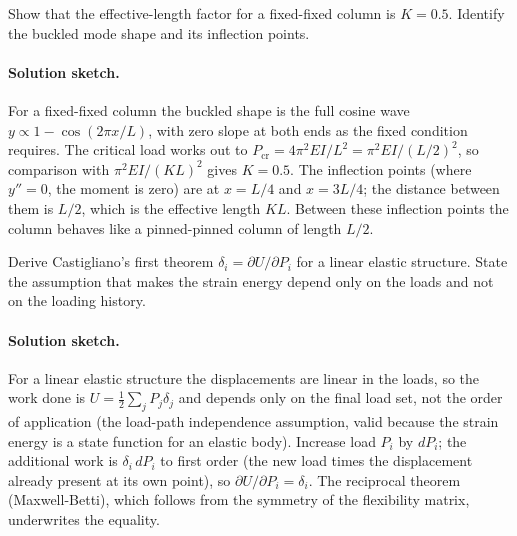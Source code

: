 \begin{exercise}
Show that the effective-length factor for a fixed-fixed column is
$K = 0.5$. Identify the buckled mode shape and its inflection
points.

\paragraph{Solution sketch.} For a fixed-fixed column the buckled shape
is the full cosine wave $y \propto 1 - \cos(2\pi x/L)$, with zero slope
at both ends as the fixed condition requires. The critical load works
out to $P_{\text{cr}} = 4\pi^2EI/L^2 = \pi^2EI/(L/2)^2$, so comparison
with $\pi^2EI/(KL)^2$ gives $K = 0.5$. The inflection points (where
$y'' = 0$, the moment is zero) are at $x = L/4$ and $x = 3L/4$; the
distance between them is $L/2$, which is the effective length $KL$.
Between these inflection points the column behaves like a pinned-pinned
column of length $L/2$.
\end{exercise}

\begin{exercise}
Derive Castigliano's first theorem $\delta_i = \partial U/\partial
P_i$ for a linear elastic structure. State the assumption that makes
the strain energy depend only on the loads and not on the loading
history.

\paragraph{Solution sketch.} For a linear elastic structure the
displacements are linear in the loads, so the work done is $U =
\tfrac12 \sum_j P_j \delta_j$ and depends only on the final load set,
not the order of application (the load-path independence assumption,
valid because the strain energy is a state function for an elastic
body). Increase load $P_i$ by $dP_i$; the additional work is
$\delta_i\,dP_i$ to first order (the new load times the displacement
already present at its own point), so $\partial U/\partial P_i =
\delta_i$. The reciprocal theorem (Maxwell-Betti), which follows from
the symmetry of the flexibility matrix, underwrites the equality.
\end{exercise}

